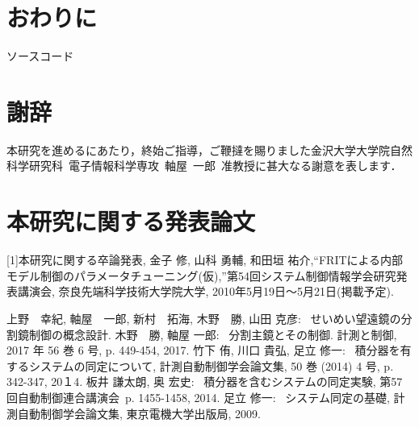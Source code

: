 \documentclass[a4paper,12pt]{jbook}
\begin{document}
\chapter{おわりに}
ソースコード
\chapter*{謝辞}
本研究を進めるにあたり，終始ご指導，ご鞭撻を賜りました金沢大学大学院自然科学研究科\ 電子情報科学専攻\ 軸屋\ 一郎\ 准教授に甚大なる謝意を表します．  
\chapter*{本研究に関する発表論文}
[1]本研究に関する卒論発表, 金子 修, 山科 勇輔, 和田垣 祐介,“FRITによる内部モデル制御のパラメータチューニング(仮),”第54回システム制御情報学会研究発表講演会, 奈良先端科学技術大学院大学, 2010年5月19日〜5月21日(掲載予定).
\clearpage
{}     %
\begin{thebibliography}{2}
上野　幸紀, 軸屋　一郎, 新村　拓海, 木野　勝, 山田 克彦:
\ せいめい望遠鏡の分割鏡制御の概念設計.
木野　勝, 軸屋 一郎:
\ 分割主鏡とその制御. 計測と制御, 2017 年 56 巻 6 号, p. 449-454, 2017.
竹下 侑, 川口 貴弘, 足立 修一:
\ 積分器を有するシステムの同定について, 計測自動制御学会論文集, 50 巻 (2014) 4 号, p. 342-347, 20１4.
板井 謙太朗, 奥 宏史:
\ 積分器を含むシステムの同定実験, 第57回自動制御連合講演会\ p. 1455-1458, 2014.
足立 修一:
\ システム同定の基礎, 計測自動制御学会論文集, 東京電機大学出版局, 2009.
\end{thebibliography}
\end{document}
